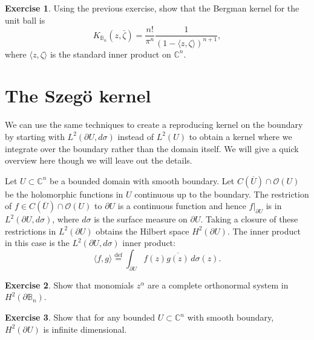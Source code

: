 \documentclass[12pt,openany]{book}
\newcommand{\linnprod}[2]{\langle #1 , #2 \rangle}
\newcommand{\C}{{\mathbb{C}}}
\newcommand{\bB}{{\mathbb{B}}}
\newcommand{\sO}{{\mathcal{O}}}
\theoremstyle{plain}
\theoremstyle{remark}
\theoremstyle{definition}
\newenvironment{exbox}{%
    \def\FrameCommand{\vrule width 1pt \relax\hspace {10pt}}%
    \MakeFramed {\advance \hsize -\width \FrameRestore }%
}{%
    \endMakeFramed
}
\theoremstyle{exercise}
\newtheorem{exercise}{Exercise}[section]
\theoremstyle{example}
\begin{document}
\begin{exbox}
\begin{exercise}
Using the previous exercise, show that the Bergman kernel for the unit ball
is
\begin{equation*}
K_{\bB_n}(z,\bar{\zeta}) =
\frac{n!}{\pi^n}\frac{1}{{(1-\linnprod{z}{\zeta})}^{n+1}},
\end{equation*}
where $\linnprod{z}{\zeta}$ is the standard inner product on $\C^n$.
\end{exercise}
\end{exbox}


\section{The Szeg{\"o} kernel}

We can use the same techniques to create a reproducing kernel on the
boundary by starting with $L^2(\partial U, d\sigma)$ instead of $L^2(U)$ to obtain a
kernel where we integrate over the boundary rather than the domain itself.
We will give a quick overview here though we will leave out the details.

Let $U \subset \C^n$ be a bounded domain with smooth boundary.  Let
$C(\overline{U}) \cap \sO(U)$ be the holomorphic functions in $U$
continuous up to the boundary.  The restriction of
$f \in C(\overline{U}) \cap \sO(U)$ to $\partial U$ is a continuous function
and hence $f|_{\partial U}$ is in $L^2(\partial U,d\sigma)$, where $d\sigma$
is the surface measure on $\partial U$.  Taking a closure
of these restrictions in $L^2(\partial U)$ obtains the Hilbert space
$H^2(\partial U)$.  The inner product in this case is the $L^2(\partial U,
d\sigma)$ inner product:
\begin{equation*}
\linnprod{f}{g} \overset{\text{def}}{=} \int_{\partial U} f(z)
\overline{g(z)} \, d\sigma(z) .
\end{equation*}

\begin{exbox}
\begin{exercise}
Show that monomials $z^\alpha$ are a complete orthonormal system in
$H^2(\partial \bB_n)$.
\end{exercise}

\begin{exercise}
Show that for any bounded $U \subset \C^n$ with smooth boundary,
$H^2(\partial U)$ is infinite dimensional.
\end{exercise}
\end{exbox}
\end{document}

